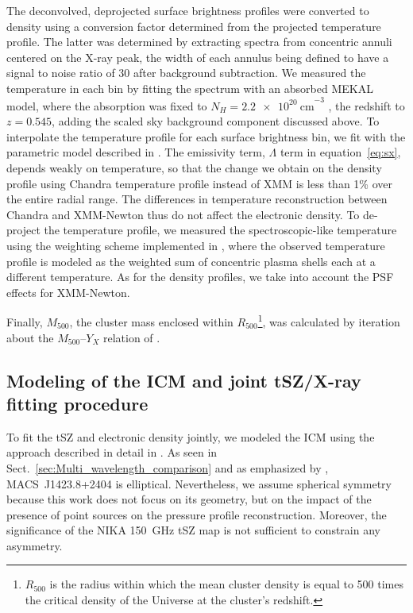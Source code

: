 \documentclass[twocolumn,traditabstract]{aa}
\begin{document}
The deconvolved, deprojected surface brightness profiles were converted to density using a conversion factor determined from the projected temperature profile. The latter was determined by extracting spectra from concentric annuli centered on the X-ray peak, the width of each annulus being defined to have a signal to noise ratio of $30$ after background subtraction. We measured the temperature in each bin by fitting the spectrum with an absorbed {\sc MEKAL} model, where the absorption was fixed to $N_{H}=\SI{2.2e20}{\centi\meter}^{-3}$ \citep{kalberla2005}, the redshift to $z=0.545$, adding the scaled sky background component discussed above. To interpolate the temperature profile for each surface brightness bin, we fit with the parametric model described in \cite{vikhlinin2006}. The emissivity term, $\Lambda$ term in equation~\ref{eq:sx}, depends weakly on temperature, so that the change we obtain on the density profile using Chandra temperature profile instead of XMM is less than 1\% over the entire radial range. The differences in temperature reconstruction between Chandra and XMM-Newton \citep[e.g.,][]{sch15} thus do not affect the electronic density. To de-project the temperature profile, we measured the spectroscopic-like temperature \citep{mazzotta2004} using the weighting scheme implemented in \cite{vikh_multit}, where the observed temperature profile is modeled as the weighted sum of concentric plasma shells each at a different temperature. As for the density profiles, we take into account the PSF effects for XMM-Newton. 

Finally, $M_{500}$, the cluster mass enclosed within $R_{500}$\footnote{$R_{500}$ is the radius within which the mean cluster density is equal to 500 times the critical density of the Universe at the cluster's redshift.}, was calculated by iteration about the $M_{500}$--$Y_X$ relation of \cite{arnaud2010}.

\subsection{Modeling of the ICM and joint tSZ/X-ray fitting procedure}\label{sec:modeling}
To fit the tSZ and electronic density jointly, we modeled the ICM using the approach described in detail in \cite{adam2014}. As seen in Sect.~\ref{sec:Multi_wavelength_comparison} and as emphasized by \cite{morandi2010}, \mbox{MACS~J1423.8+2404} is elliptical. Nevertheless, we assume spherical symmetry because this work does not focus on its geometry, but on the impact of the presence of point sources on the pressure profile reconstruction. Moreover, the significance of the NIKA 150~GHz tSZ map is not sufficient to constrain any asymmetry. 
\end{document}
